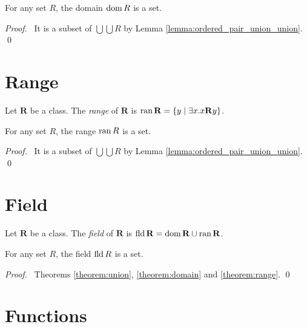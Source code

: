 \begin{theorem}
    \label{theorem:domain}
    For any set $R$, the domain $\operatorname{dom} R$ is a set.
\end{theorem}

\begin{proof}
    \pf\ It is a subset of $\bigcup \bigcup R$ by Lemma \ref{lemma:ordered_pair_union_union}. \qed
\end{proof}

\section{Range}

\begin{definition}
    Let $\mathbf{R}$ be a class. The \emph{range} of $\mathbf{R}$ is 
    $\operatorname{ran} \mathbf{R} = \{ y \mid \exists x. x\mathbf{R}y \}$.
\end{definition}

\begin{theorem}
    \label{theorem:range}
    For any set $R$, the range $\operatorname{ran} R$ is a set.
\end{theorem}

\begin{proof}
    \pf\ It is a subset of $\bigcup \bigcup R$ by Lemma \ref{lemma:ordered_pair_union_union}. \qed
\end{proof}

\section{Field}

\begin{definition}[Field]
    Let $\mathbf{R}$ be a class. The \emph{field} of $\mathbf{R}$ is
    $\operatorname{fld} \mathbf{R} = \operatorname{dom} \mathbf{R} \cup \operatorname{ran} \mathbf{R}$.
\end{definition}

\begin{theorem}
    For any set $R$, the field $\operatorname{fld} R$ is a set.
\end{theorem}

\begin{proof}
    \pf\ Theorems \ref{theorem:union}, \ref{theorem:domain} and \ref{theorem:range}. \qed
\end{proof}

\section{Functions}

